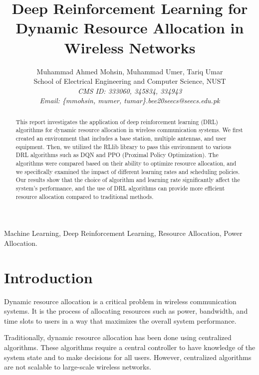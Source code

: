 \documentclass[conference]{IEEEtran}
\begin{document}
\title{Deep Reinforcement Learning for Dynamic Resource Allocation in Wireless Networks}

\author{Muhammad Ahmed Mohsin, Muhammad Umer, Tariq Umar\\
	School of Electrical Engineering and Computer Science, NUST\\
	\textit{CMS ID: 333060, 345834, 334943}\\
	\textit{Email: \{mmohsin, mumer, tumar\}.bee20seecs@seecs.edu.pk}
}

\maketitle

\begin{abstract}
This report investigates the application of deep reinforcement learning (DRL) algorithms for dynamic resource allocation in wireless communication systems. We first created an environment that includes a base station, multiple antennas, and user equipment. Then, we utilized the RLlib library to pass this environment to various DRL algorithms such as DQN and PPO (Proximal Policy Optimization). The algorithms were compared based on their ability to optimize resource allocation, and we specifically examined the impact of different learning rates and scheduling policies. Our results show that the choice of algorithm and learning rate significantly affect the system's performance, and the use of DRL algorithms can provide more efficient resource allocation compared to traditional methods.

\end{abstract}

\begin{IEEEkeywords}
Machine Learning, Deep Reinforcement Learning, Resource Allocation, Power Allocation.
\end{IEEEkeywords}

\section{Introduction}
Dynamic resource allocation is a critical problem in wireless communication systems. It is the process of allocating resources such as power, bandwidth, and time slots to users in a way that maximizes the overall system performance.

Traditionally, dynamic resource allocation has been done using centralized algorithms. These algorithms require a central controller to have knowledge of the system state and to make decisions for all users. However, centralized algorithms are not scalable to large-scale wireless networks.
\end{document}
